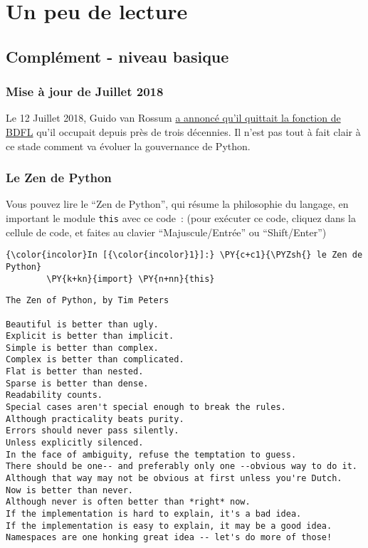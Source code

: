     \hypertarget{un-peu-de-lecture}{%
\section{Un peu de lecture}\label{un-peu-de-lecture}}

    \hypertarget{compluxe9ment---niveau-basique}{%
\subsection{Complément - niveau
basique}\label{compluxe9ment---niveau-basique}}

    \hypertarget{mise-uxe0-jour-de-juillet-2018}{%
\subsubsection{Mise à jour de Juillet
2018}\label{mise-uxe0-jour-de-juillet-2018}}

    Le 12 Juillet 2018, Guido van Rossum
\href{https://lwn.net/Articles/759654/}{a annoncé qu'il quittait la
fonction de BDFL} qu'il occupait depuis près de trois décennies. Il
n'est pas tout à fait clair à ce stade comment va évoluer la gouvernance
de Python.

    \hypertarget{le-zen-de-python}{%
\subsubsection{Le Zen de Python}\label{le-zen-de-python}}

    Vous pouvez lire le ``Zen de Python'', qui résume la philosophie du
langage, en important le module \texttt{this} avec ce code~: (pour
exécuter ce code, cliquez dans la cellule de code, et faites au clavier
``Majuscule/Entrée'' ou ``Shift/Enter'')

    \begin{Verbatim}[commandchars=\\\{\}]
{\color{incolor}In [{\color{incolor}1}]:} \PY{c+c1}{\PYZsh{} le Zen de Python}
        \PY{k+kn}{import} \PY{n+nn}{this}
\end{Verbatim}


    \begin{Verbatim}[commandchars=\\\{\}]
The Zen of Python, by Tim Peters

Beautiful is better than ugly.
Explicit is better than implicit.
Simple is better than complex.
Complex is better than complicated.
Flat is better than nested.
Sparse is better than dense.
Readability counts.
Special cases aren't special enough to break the rules.
Although practicality beats purity.
Errors should never pass silently.
Unless explicitly silenced.
In the face of ambiguity, refuse the temptation to guess.
There should be one-- and preferably only one --obvious way to do it.
Although that way may not be obvious at first unless you're Dutch.
Now is better than never.
Although never is often better than *right* now.
If the implementation is hard to explain, it's a bad idea.
If the implementation is easy to explain, it may be a good idea.
Namespaces are one honking great idea -- let's do more of those!

    \end{Verbatim}

